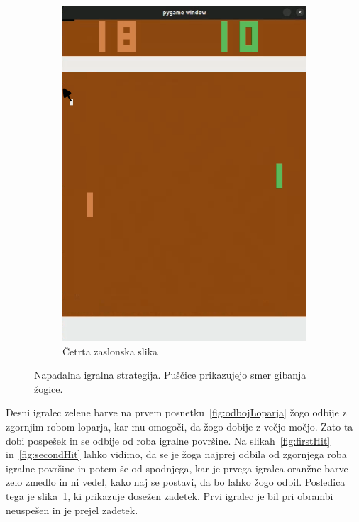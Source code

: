 \documentclass[cover]{thesis}
\begin{document}
\begin{figure}[H]
\begin{subfigure}{0.495\linewidth}
        \includegraphics[width=\textwidth]{Score.png}
        \caption{Četrta zaslonska slika}\label{fig:score}
    \end{subfigure}
    \caption{Napadalna igralna strategija. Puščice prikazujejo smer gibanja žogice.}\label{fig:screenShots}
\end{figure}

Desni igralec zelene barve na prvem posnetku~\ref{fig:odbojLoparja} žogo odbije z zgornjim robom loparja, kar mu omogoči, da žogo dobije z večjo močjo. Zato ta dobi pospešek in se odbije od roba igralne površine. Na slikah~\ref{fig:firstHit} in~\ref{fig:secondHit} lahko vidimo, da se je žoga najprej odbila od zgornjega roba igralne površine in potem še od spodnjega, kar je prvega igralca oranžne barve zelo zmedlo in ni vedel, kako naj se postavi, da bo lahko žogo odbil. Posledica tega je slika~\ref{fig:score}, ki prikazuje dosežen zadetek. Prvi igralec je bil pri obrambi neuspešen in je prejel zadetek.
\end{document}
